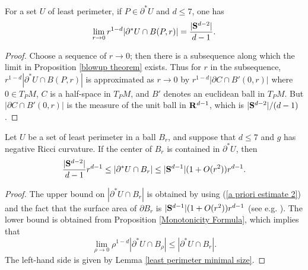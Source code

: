 \begin{lemma}\label{least perimeter minimal size}
For a set $U$ of least perimeter, if $P \in \partial^* U$ and $d \leq 7$, one has
$$\lim_{r \to 0} r^{1 - d} |\partial^* U \cap B(P, r)| = \frac{|\mathbf S^{d - 2}|}{d - 1}.$$
\end{lemma}
\begin{proof}
Choose a sequence of $r \to 0$; then there is a subsequence along which the limit in Proposition \ref{blowup theorem} exists.
Thus for $r$ in the subsequence, $r^{1 - d} |\partial^* U \cap B(P, r)|$ is approximated as $r \to 0$ by $r^{1 - d}|\partial C \cap B'(0, r)|$ where $0 \in T_PM$, $C$ is a half-space in $T_PM$, and $B'$ denotes an euclidean ball in $T_PM$.
But $|\partial C \cap B'(0, r)|$ is the measure of the unit ball in $\mathbf{R}^{d - 1}$, which is $|\mathbf S^{d - 2}|/(d - 1)$.
\end{proof}

\begin{proposition}\label{doubling dimension}
Let $U$ be a set of least perimeter in a ball $B_r$, and suppose that $d \leq 7$ and $g$ has negative Ricci curvature.
If the center of $B_r$ is contained in $\partial^* U$, then
$$\frac{|\mathbf S^{d - 2}|}{d - 1} r^{d - 1} \leq |\partial^*U \cap B_r| \leq |\mathbf S^{d - 1}|(1 + O(r^2))r^{d - 1}.$$
\end{proposition}
\begin{proof}
The upper bound on $|\partial^* U \cap B_r|$ is obtained by using (\ref{a priori estimate 2}) and the fact that the surface area of $\partial B_r$ is $|\mathbf S^{d - 1}|(1 + O(r^2))r^{d - 1}$ (see e.g. \cite{gray1974volume}).
The lower bound is obtained from Proposition \ref{Monotonicity Formula}, which implies that
$$\lim_{\rho \to 0} \rho^{1 - d} |\partial^* U \cap B_\rho| \leq |\partial^* U \cap B_r|.$$
The left-hand side is given by Lemma \ref{least perimeter minimal size}.
\end{proof}


